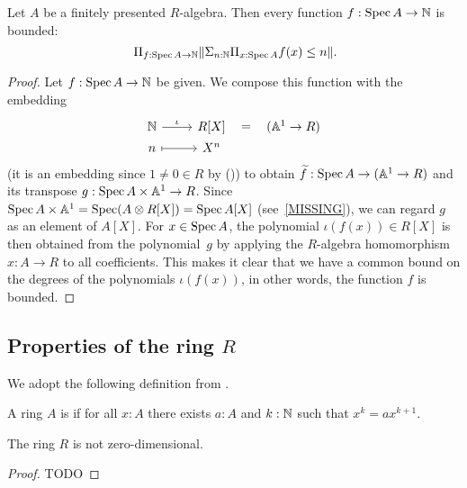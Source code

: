 \begin{theorem}%
  \label{boundedness}
  Let $A$ be a finitely presented $R$-algebra.
  Then every function $f : \operatorname{Spec} A \to \mathbb{N}$ is bounded:
  \[ \Pi_{f : \Spec A \to \N} \propTrunc{\Sigma_{n : \N} \Pi_{x : \Spec A} f(x) \le n}
     \rlap{.} \]
\end{theorem}

\begin{proof}
  Let $f : \operatorname{Spec} A \to \mathbb{N}$ be given.
  We compose this function with the embedding
  \[ \begin{tikzcd}[row sep=0mm]
    \N \ar[r, "\iota"] & R[X] \ar[r, phantom, "{=}"] & (\A^1 \to R) \\
    n \ar[r, mapsto] & X^n
  \end{tikzcd} \]
  (it is an embedding since $1 \neq 0 \in R$ by ())
  to obtain $\widetilde{f} : \operatorname{Spec} A \to (\mathbb{A}^1 \to R)$
  and its transpose $g : \operatorname{Spec} A \times \mathbb{A}^1 \to R$.
  Since $\operatorname{Spec} A \times \mathbb{A}^1 = \operatorname{Spec} (A \otimes R[X]) = \operatorname{Spec} A[X]$
  (see~\ref{MISSING}),
  we can regard $g$ as an element of $A[X]$.
  For $x \in \operatorname{Spec} A$,
  the polynomial $\iota(f(x)) \in R[X]$ is then obtained from the polynomial~$g$
  by applying the $R$-algebra homomorphism $x : A \to R$ to all coefficients.
  This makes it clear that
  we have a common bound on the degrees of the polynomials $\iota(f(x))$,
  in other words,
  the function $f$ is bounded.
\end{proof}

\subsection{Properties of the ring $R$}

We adopt the following definition from
\cite[Section IV.8]{lombardi-quitte}.

\begin{definition}%
  \label{zero-dimensional-ring}
  A ring $A$ is 
  if for all $x : A$
  there exists $a : A$ and $k : \mathbb{N}$
  such that $x^k = a x^{k + 1}$.
\end{definition}

\begin{lemma}%
  \label{R-not-zero-dimensional}
  The ring $R$ is not zero-dimensional.
\end{lemma}

\begin{proof}
  TODO
\end{proof}
